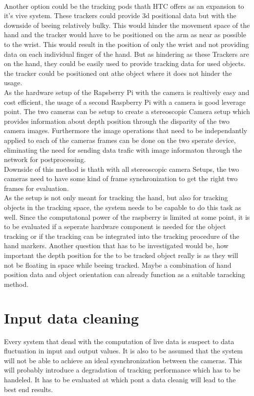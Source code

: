 \\Another option could be the tracking  pods thath HTC offers as an expansion to it's vive system. These trackers could provide 3d positional data but with the downside of beeing relatively bulky. This would hinder the movement space of the hand and the tracker would have to be positioned on the arm as near as possible to the wrist. This would result in the position of only the wrist and not providing data on each individual finger of the hand. But as hindering as these Trackers are on the hand, they could be easily used to provide tracking data for used objects. the tracker could be positioned ont athe object where it does not hinder the usage. \\
As the hardware setup of the Rapsberry Pi with the camera is realtively easy and cost efficient, the usage of a second Raspberry Pi with a camera is good leverage point. The two cameras can be setup to create a stereoscopic Camera setup which provides information about depth position through the disparity of the two camera images. 
Furthermore the image operations that need to be independantly applied to each of the cameras frames can be done on the two sperate device, eliminating the need for sending data trafic with image informaton through the network for postprocessing.
\\Downside of this method is thath with all stereoscopic camera Setups, the two cameras need to have some kind of frame synchronization to get the right two frames for evaluation.
\\As the setup is not only meant for tracking the hand, but also for tracking objects in the tracking space, the system needs to be capable to do this task as well. Since the computatonal power of the raspberry is limited at some point, it is to be evaluated if a seperate hardware component is needed for the object tracking or if the tracking can be integrated into the tracking procedure of the hand markers. Another question that has to be investigated would be, how important the depth position for the to be tracked object really is as they will not be floating in space while beeing tracked. Maybe a combination of hand position data and object orientation can already function as a suitable taracking method.
\section{Input data cleaning}
Every system that deasl with the computation of live data is suspect to data fluctuation in input and output values. It is also to be assumed that the system will not be able to achieve an ideal sysnchronization between the cameras. This will probably introduce a degradation of tracking performance which has to be handeled. It has to be evaluated at which pont a data cleanig will lead to the best end results.
